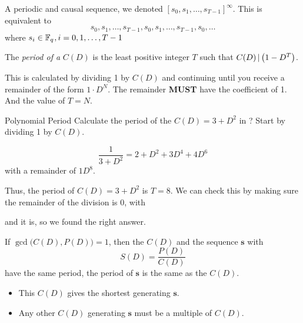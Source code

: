 A periodic and causal sequence, we denoted ${\left[ s_{0}, s_{1}, \ldots, s_{T-1} \right]}^{\infty}$.
This is equivalent to
\begin{equation*}
  s_{0}, s_{1}, \ldots, s_{T-1}, s_{0}, s_{1}, \ldots, s_{T-1}, s_{0}, \ldots
\end{equation*}
where $s_{i} \in \mathbb{F}_{q^{}}, i = 0, 1, \ldots, T-1$

\begin{definition}\label{def:Polynomial_Period}
  The \emph{period of a } $C(D)$ is the least positive integer $T$ such that $C(D) \operatorname{\vert} \left( 1-D^{T} \right)$.

  This is calculated by dividing 1 by $C(D)$ and continuing until you receive a remainder of the form $1\cdot D^{N}$.
  The remainder \textbf{MUST} have the coefficient of 1.
  And the value of $T=N$.
\end{definition}

\begin{example}{Polynomial Period}
  Calculate the period of the  $C(D) = 3 + D^{2}$ in ?
  \tcblower{}
  Start by dividing 1 by $C(D)$.

  \begin{equation*}
    \frac{1}{3+D^{2}} = 2 + D^{2} + 3D^{4} + 4D^{6}
  \end{equation*}
  with a remainder of $1D^{8}$.

  Thus, the period of $C(D) = 3+D^{2}$ is $T=8$.
  We can check this by making sure the remainder of the division is 0, with
  \begin{center}
  \end{center}
  and it is, so we found the right answer.
\end{example}

\begin{theorem}\label{thm:GCD_Connection_Polynomial_S_Sequence}
  If $\gcd \bigl( C(D), P(D) \bigr) = 1$, then the  $C(D)$ and the sequence $\mathbf{s}$ with 
  \begin{equation*}
    S(D) = \frac{P(D)}{C(D)}
  \end{equation*}
  have the same period, the period of $\mathbf{s}$ is the same as the  $C(D)$.
\end{theorem}
\begin{itemize}[noitemsep]
\item This $C(D)$ gives the shortest  generating $\mathbf{s}$.
\item Any other $C(D)$ generating $\mathbf{s}$ must be a multiple of $C(D)$.
\end{itemize}

